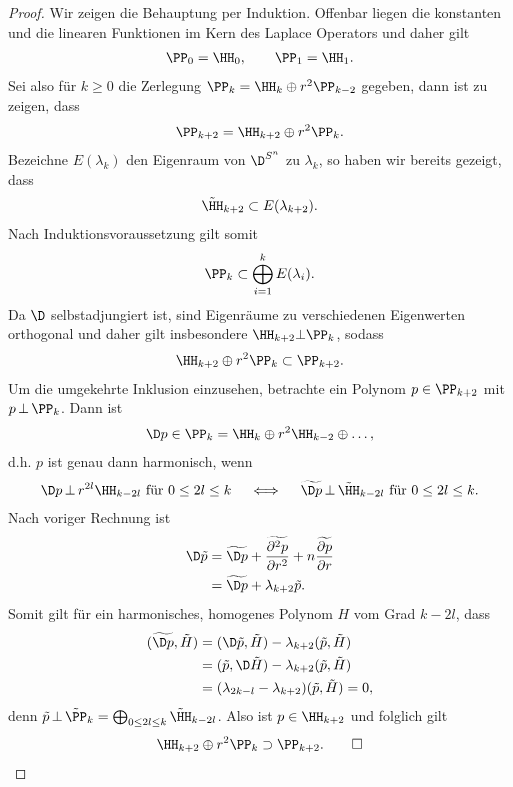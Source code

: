 \documentclass[%
	paper=a5,%
	fleqn,%
	DIV=18,%
	BCOR=0mm,
	fontsize=11pt,
	titlepage=false,%
	bibliography=totoc,
	DIV=18,%
	twoside=true,
	pdftitle=Riemannsche Geometrie,
	pdfauthor=Uwe Semmelmann,
	numbers=noendperiod]%
	{scrbook}
\begin{document}
\begin{proof}
Wir zeigen die Behauptung per Induktion. Offenbar liegen die konstanten und die linearen Funktionen im Kern des Laplace Operators und daher gilt 
\begin{align*}
\PP_{0} = \HH_{0},\qquad \PP_{1} = \HH_{1}.
\end{align*}
Sei also für $k\ge 0$ die Zerlegung $\PP_{k} = \HH_{k}\oplus r^2\PP_{k-2}$ gegeben, dann ist zu zeigen, dass
\begin{align*}
\PP_{k+2} = \HH_{k+2}\oplus r^2\PP_{k}.
\end{align*}
Bezeichne $E(\lambda_{k})$ den Eigenraum von $\D^{S^n}$ zu $\lambda_{k}$, so haben wir bereits gezeigt, dass
\begin{align*}
\tilde\HH_{k+2} \subset E(\lambda_{k+2}).
\end{align*}
Nach Induktionsvoraussetzung gilt somit
\begin{align*}
\PP_{k} \subset \bigoplus_{i=1}^k E(\lambda_{i}).
\end{align*}
Da $\D$ selbstadjungiert ist, sind Eigenräume zu verschiedenen Eigenwerten orthogonal und daher gilt insbesondere $\HH_{k+2}\bot \PP_{k}$, sodass
\begin{align*}
\HH_{k+2}\oplus r^2\PP_{k} \subset \PP_{k+2}.
\end{align*}
Um die umgekehrte Inklusion einzusehen, betrachte ein Polynom $p\in\PP_{k+2}$ mit $p\,\bot\, \PP_{k}$. Dann ist
\begin{align*}
\D p\in\PP_{k}=\HH_{k}\oplus r^2\HH_{k-2}\oplus \ldots,
\end{align*}
d.h. $p$ ist genau dann harmonisch, wenn
\begin{align*}
\D p \,\bot\, r^{2l}\HH_{k-2l} \text{ für }0\le 2l\le k
\quad
\iff
\quad
\widetilde{\D p} \,\bot\, \tilde\HH_{k-2l} \text{ für }0\le 2l\le k.
\end{align*}
Nach voriger Rechnung ist
\begin{align*}
\D \tilde p &= \widetilde{\D p} + \widetilde{\frac{\partial^2 p}{\partial r^2}}
+n\widetilde{\frac{\partial p}{\partial r}}\\
&= \widetilde{\D p} + \lambda_{k+2}\tilde{p}.
\end{align*}
Somit gilt für ein harmonisches, homogenes Polynom $H$ vom Grad $k-2l$, dass
\begin{align*}
(\widetilde{\D p},\tilde{H}) 
&= (\D\tilde{p},\tilde{H}) - \lambda_{k+2}(\tilde{p},\tilde{H})\\
&= (\tilde{p},\D\tilde{H}) - \lambda_{k+2}(\tilde{p},\tilde{H})\\
&= (\lambda_{2k-l}-\lambda_{k+2}) (\tilde{p},\tilde{H}) = 0,
\end{align*}
denn $\tilde p\,\bot\, \tilde\PP_{k}=\bigoplus_{0\le 2l\le k} \tilde\HH_{k-2l}$. Also ist $p\in\HH_{k+2}$ und folglich gilt
\begin{align*}
\HH_{k+2}\oplus r^2\PP_{k} \supset \PP_{k+2}.\qed
\end{align*}
\end{proof}
\end{document}
